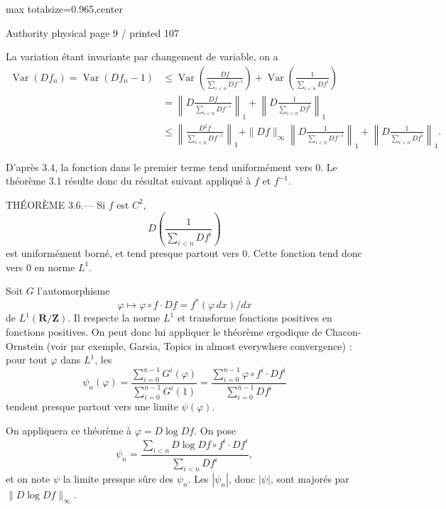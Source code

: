 \documentclass{article}
\begin{document}
\newpage
\noindent\begin{adjustbox}{max totalsize={\textwidth}{0.965\textheight},center}\begin{minipage}{\textwidth}
\noindent\hfill\scriptsize Authority physical page 9 / printed 107\par\normalsize
La variation étant invariante par changement de variable, on a
\[
\begin{aligned}
\operatorname{Var}(Df_n)=\operatorname{Var}(Df_n-1)
&\leq\operatorname{Var}\left(\frac{Df}{\sum_{i<n}Df^{-i}}\right)
+\operatorname{Var}\left(\frac1{\sum_{i<n}Df^i}\right)\\
&=\left\|D\frac{Df}{\sum_{i<n}Df^{-i}}\right\|_1
+\left\|D\frac1{\sum_{i<n}Df^i}\right\|_1\\
&\leq\left\|\frac{D^2f}{\sum_{i<n}Df^{-i}}\right\|_1
+\|Df\|_\infty\left\|D\frac1{\sum_{i<n}Df^{-i}}\right\|_1
+\left\|D\frac1{\sum_{i<n}Df^i}\right\|_1.
\end{aligned}
\]

D’après 3.4, la fonction dans le premier terme tend uniformément vers \(0\). Le théorème 3.1 résulte donc du résultat suivant appliqué à \(f\) et \(f^{-1}\).

THÉORÈME 3.6.— Si \(f\) est \(C^2\),
\[
D\left(\frac1{\sum_{i<n}Df^i}\right)
\]
est uniformément borné, et tend presque partout vers \(0\). Cette fonction tend donc vers \(0\) en norme \(L^1\).

Soit \(G\) l’automorphisme
\[
\varphi\longmapsto\varphi\circ f\cdot Df=f^*(\varphi\,dx)/dx
\]
de \(L^1(\mathbf R/\mathbf Z)\). Il respecte la norme \(L^1\) et transforme fonctions positives en fonctions positives. On peut donc lui appliquer le théorème ergodique de Chacon-Ornstein (voir par exemple, Garsia, Topics in almost everywhere convergence) : pour tout \(\varphi\) dans \(L^1\), les
\[
\psi_n(\varphi)
=\frac{\sum_{i=0}^{n-1}G^i(\varphi)}{\sum_{i=0}^{n-1}G^i(1)}
=\frac{\sum_{i=0}^{n-1}\varphi\circ f^i\cdot Df^i}{\sum_{i=0}^{n-1}Df^i}
\]
tendent presque partout vers une limite \(\psi(\varphi)\).

On appliquera ce théorème à \(\varphi=D\log Df\). On pose
\[
\psi_n=\frac{\sum_{i<n}D\log Df\circ f^i\cdot Df^i}{\sum_{i<n}Df^i},
\]
et on note \(\psi\) la limite presque sûre des \(\psi_n\). Les \(|\psi_n|\), donc \(|\psi|\), sont majorés par \(\|D\log Df\|_\infty\).
\end{minipage}\end{adjustbox}
\end{document}
